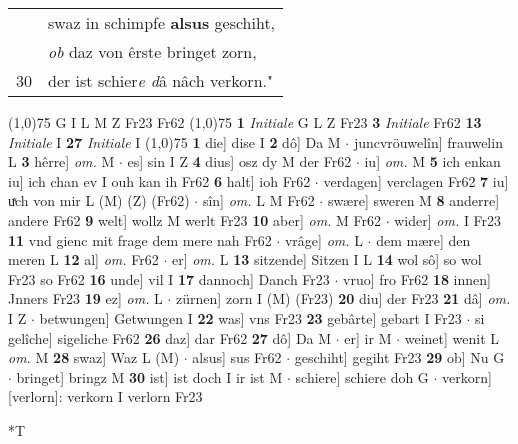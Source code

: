 \documentclass[8pt,a4paper,notitlepage]{article}
\begin{document}
\begin{table}[ht]
\begin{minipage}[t]{0.5\linewidth}
\begin{tabular}{rl}
 & swaz in schimpfe \textbf{alsus} geschiht,\\ 
 & \textit{ob} daz von êrste bringet zorn,\\ 
30 & der ist schier\textit{e d}â nâch verkorn."\\ 
\end{tabular}
\scriptsize
\line(1,0){75} \newline
G I L M Z Fr23 Fr62 \newline
\line(1,0){75} \newline
\textbf{1} \textit{Initiale} G L Z Fr23  \textbf{3} \textit{Initiale} Fr62  \textbf{13} \textit{Initiale} I  \textbf{27} \textit{Initiale} I  \newline
\line(1,0){75} \newline
\textbf{1} die] dise I \textbf{2} dô] Da M  $\cdot$ juncvröuwelîn] frauwelin L \textbf{3} hêrre] \textit{om.} M  $\cdot$ es] sin I Z \textbf{4} dius] osz dy M der Fr62  $\cdot$ iu] \textit{om.} M \textbf{5} ich enkan iu] ich chan ev I ouh kan ih Fr62 \textbf{6} halt] ioh Fr62  $\cdot$ verdagen] verclagen Fr62 \textbf{7} iu] uͯch von mir L (M) (Z) (Fr62)  $\cdot$ sîn] \textit{om.} L M Fr62  $\cdot$ swære] sweren M \textbf{8} anderre] andere Fr62 \textbf{9} welt] wollz M werlt Fr23 \textbf{10} aber] \textit{om.} M Fr62  $\cdot$ wider] \textit{om.} I Fr23 \textbf{11} vnd gienc mit frage dem mere nah Fr62  $\cdot$ vrâge] \textit{om.} L  $\cdot$ dem mære] den meren L \textbf{12} al] \textit{om.} Fr62  $\cdot$ er] \textit{om.} L \textbf{13} sitzende] Sitzen I L \textbf{14} wol sô] so wol Fr23 so Fr62 \textbf{16} unde] vil I \textbf{17} dannoch] Danch Fr23  $\cdot$ vruo] fro Fr62 \textbf{18} innen] Jnners Fr23 \textbf{19} ez] \textit{om.} L  $\cdot$ zürnen] zorn I (M) (Fr23) \textbf{20} diu] der Fr23 \textbf{21} dâ] \textit{om.} I Z  $\cdot$ betwungen] Getwungen I \textbf{22} was] vns Fr23 \textbf{23} gebârte] gebart I Fr23  $\cdot$ si gelîche] sigeliche Fr62 \textbf{26} daz] dar Fr62 \textbf{27} dô] Da M  $\cdot$ er] ir M  $\cdot$ weinet] wenit L \textit{om.} M \textbf{28} swaz] Waz L (M)  $\cdot$ alsus] sus Fr62  $\cdot$ geschiht] gegiht Fr23 \textbf{29} ob] Nu G  $\cdot$ bringet] bringz M \textbf{30} ist] ist doch I ir ist M  $\cdot$ schiere] schiere doh G  $\cdot$ verkorn] [verlorn]: verkorn I verlorn Fr23 \newline
\end{minipage}
\hspace{0.5cm}
\begin{minipage}[t]{0.5\linewidth}
\small
\begin{center}*T

\end{center}
\end{minipage}
\end{table}
\end{document}

